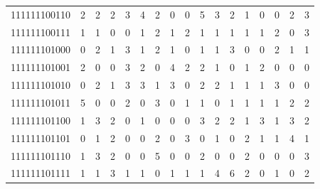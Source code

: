 \documentclass[10pt,a4paper]{article}
\begin{document}
\begin{longtable}{ |c|c|c|c|c|c|c|c|c|c|c|c|c|c|c|c|c| }
    111111100110              & 2                            & 2                                & 2                            & 3                              & 4   & 2   & 0   & 0   & 5   & 3   & 2   & 1   & 0   & 0   & 2   & 3   \\
    111111100111              & 1                            & 1                                & 0                            & 0                              & 1   & 2   & 1   & 2   & 1   & 1   & 1   & 1   & 1   & 2   & 0   & 3   \\
    111111101000              & 0                            & 2                                & 1                            & 3                              & 1   & 2   & 1   & 0   & 1   & 1   & 3   & 0   & 0   & 2   & 1   & 1   \\
    111111101001              & 2                            & 0                                & 0                            & 3                              & 2   & 0   & 4   & 2   & 2   & 1   & 0   & 1   & 2   & 0   & 0   & 0   \\
    111111101010              & 0                            & 2                                & 1                            & 3                              & 3   & 1   & 3   & 0   & 2   & 2   & 1   & 1   & 1   & 3   & 0   & 0   \\
    111111101011              & 5                            & 0                                & 0                            & 2                              & 0   & 3   & 0   & 1   & 1   & 0   & 1   & 1   & 1   & 1   & 2   & 2   \\
    111111101100              & 1                            & 3                                & 2                            & 0                              & 1   & 0   & 0   & 0   & 3   & 2   & 2   & 1   & 3   & 1   & 3   & 2   \\
    111111101101              & 0                            & 1                                & 2                            & 0                              & 0   & 2   & 0   & 3   & 0   & 1   & 0   & 2   & 1   & 1   & 4   & 1   \\
    111111101110              & 1                            & 3                                & 2                            & 0                              & 0   & 5   & 0   & 0   & 2   & 0   & 0   & 2   & 0   & 0   & 0   & 3   \\
    111111101111              & 1                            & 1                                & 3                            & 1                              & 1   & 0   & 1   & 1   & 1   & 4   & 6   & 2   & 0   & 1   & 0   & 2   \\

\end{longtable}
\end{document}

